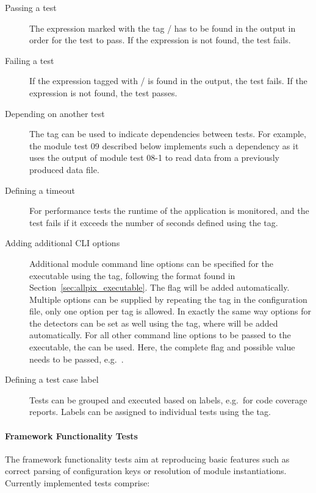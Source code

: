 \begin{description}
  \item[Passing a test] The expression marked with the tag / has to be found in the output in order for the test to pass. If the expression is not found, the test fails.
  \item[Failing a test] If the expression tagged with / is found in the output, the test fails. If the expression is not found, the test passes.
  \item[Depending on another test] The tag  can be used to indicate dependencies between tests. For example, the module test 09 described below implements such a dependency as it uses the output of module test 08-1 to read data from a previously produced \apsq data file.
  \item[Defining a timeout] For performance tests the runtime of the application is monitored, and the test fails if it exceeds the number of seconds defined using the  tag.
  \item[Adding additional CLI options] Additional module command line options can be specified for the  executable using the  tag, following the format found in Section~\ref{sec:allpix_executable}. The  flag will be added automatically. Multiple options can be supplied by repeating the  tag in the configuration file, only one option per tag is allowed. In exactly the same way options for the detectors can be set as well using the  tag, where  will be added automatically.
  For all other command line options to be passed to the executable, the  can be used. Here, the complete flag and possible value needs to be passed, e.g.\ .
  \item[Defining a test case label] Tests can be grouped and executed based on labels, e.g.\ for code coverage reports. Labels can be assigned to individual tests using the  tag.
\end{description}

\paragraph{Framework Functionality Tests}

The framework functionality tests aim at reproducing basic features such as correct parsing of configuration keys or resolution of module instantiations.
Currently implemented tests comprise:

